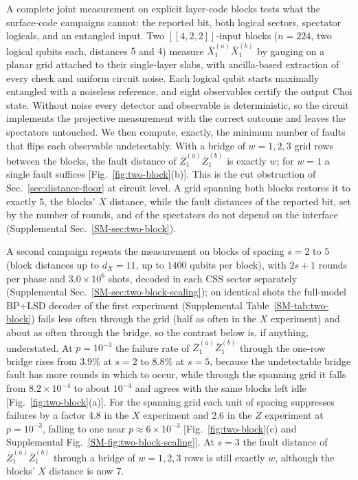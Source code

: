 A complete joint measurement on explicit layer-code blocks tests what the
surface-code campaigns cannot: the reported bit, both logical sectors,
spectator logicals, and an entangled input.  Two $[[4,2,2]]$-input blocks
($n=224$, two logical qubits each, distances $5$ and $4$) measure
$\overline X_1^{(a)}\overline X_1^{(b)}$ by gauging on a planar grid attached
to their single-layer slabs, with ancilla-based extraction of every check and
uniform circuit noise.  Each logical qubit starts maximally entangled with a
noiseless reference, and eight observables certify the output Choi state.
Without noise every detector and observable is deterministic, so the circuit
implements the projective measurement with the correct outcome and leaves the
spectators untouched.  We then compute, exactly, the minimum number of faults
that flips each observable undetectably.  With a bridge of $w=1,2,3$ grid rows
between the blocks, the fault distance of
$\overline Z_1^{(a)}\overline Z_1^{(b)}$ is exactly $w$; for $w=1$ a single fault
suffices [Fig.~\ref{fig:two-block}(b)].  This is the cut obstruction of
Sec.~\ref{sec:distance-floor} at circuit level.  A grid spanning both blocks restores it to exactly $5$, the
blocks' $X$ distance, while the fault distances of the reported bit, set by
the number of rounds, and of the spectators do not depend on the interface
(Supplemental Sec.~\ref{SM-sec:two-block}).

A second campaign repeats the measurement on blocks of spacing $s=2$ to $5$
(block distances up to $d_X=11$, up to $1400$ qubits per block), with $2s+1$
rounds per phase and $3.0\times10^6$ shots, decoded in each CSS sector
separately (Supplemental Sec.~\ref{SM-sec:two-block-scaling}); on identical
shots the full-model BP+LSD decoder of the first experiment (Supplemental
Table~\ref{SM-tab:two-block}) fails less often through the grid
(half as often in the $X$ experiment) and about as often through the bridge,
so the contrast below is, if anything, understated.  At $p=10^{-3}$ the failure rate of
$\overline Z_1^{(a)}\overline Z_1^{(b)}$ through the one-row bridge rises from
$3.9\%$ at $s=2$ to $8.8\%$ at $s=5$, because the undetectable bridge fault
has more rounds in which to occur, while through the spanning grid it falls
from $8.2\times10^{-4}$ to about $10^{-4}$ and agrees with the same blocks
left idle [Fig.~\ref{fig:two-block}(a)].  For the spanning grid each unit of
spacing suppresses failures by a factor $4.8$ in the $X$ experiment and $2.6$
in the $Z$ experiment at $p=10^{-3}$, falling to one near
$p\approx6\times10^{-3}$ [Fig.~\ref{fig:two-block}(c) and Supplemental
Fig.~\ref{SM-fig:two-block-scaling}].  At $s=3$ the fault distance of
$\overline Z_1^{(a)}\overline Z_1^{(b)}$ through a bridge of $w=1,2,3$ rows is
still exactly $w$, although the blocks' $X$ distance is now $7$.


